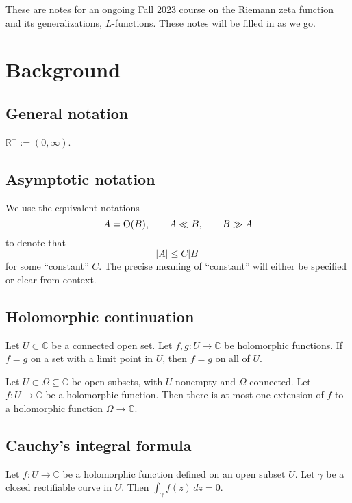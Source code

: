 \documentclass[reqno]{amsart}  \numberwithin{theorem}{section} \numberwithin{equation}{section}
\begin{document}
These are notes for an ongoing Fall 2023 course on the Riemann zeta function and its generalizations, $L$-functions.  These notes will be filled in as we go.

\newpage
\section{Background}

\subsection{General notation}
$\mathbb{R}^+ := (0,\infty)$.

\subsection{Asymptotic notation}
We use the equivalent notations
\begin{equation*}
  A = \operatorname{O}(B), \qquad A \ll B,
  \qquad B \gg A
\end{equation*}
to denote that
\begin{equation*}
\lvert A \rvert \leq C \lvert B \rvert
\end{equation*}
for some ``constant'' $C$.  The precise meaning of ``constant'' will either be specified or clear from context.

\subsection{Holomorphic continuation}

\begin{theorem}
  Let $U \subset \mathbb{C} $ be a connected open set.  Let $f, g : U \rightarrow \mathbb{C} $ be holomorphic functions.  If $f = g$ on a set with a limit point in $U$, then $f = g$ on all of $U$.
\end{theorem}
\begin{corollary}\label{corollary:cj3vqbthht}
  Let $U \subset \Omega \subseteq \mathbb{C} $ be open subsets, with $U$ nonempty and $\Omega$ connected.  Let $f : U \rightarrow \mathbb{C}$ be a holomorphic function.  Then there is at most one extension of $f$ to a holomorphic function $\Omega \rightarrow \mathbb{C}$.
\end{corollary}

\subsection{Cauchy's integral formula}
\begin{theorem}
  Let $f : U \rightarrow \mathbb{C} $ be a holomorphic function defined on an open subset $U$.  Let $\gamma$ be a closed rectifiable curve in $U$.  Then $\int_\gamma f(z) \, d z = 0$.
\end{theorem}
\end{document}
